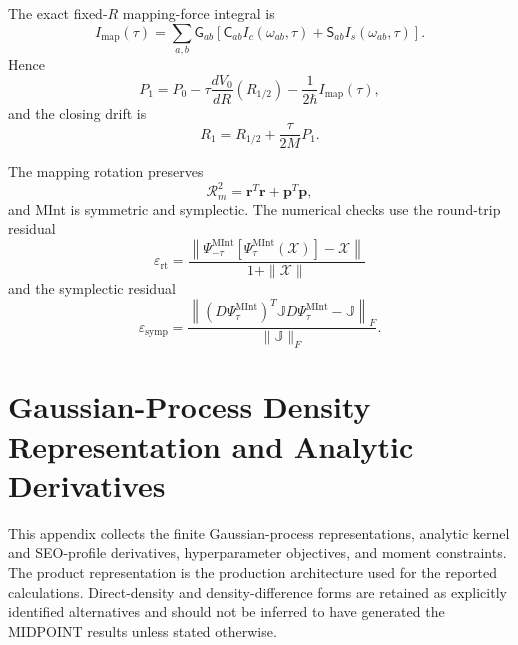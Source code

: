 \documentclass[
  11pt,
  letterpaper,
  onehalfspacing,
  normalmargins,
  equalmargins,
  oneside
]{ut-thesis}
\begin{document}
The exact fixed-\(R\) mapping-force integral is
\begin{equation}
I_{\mathrm{map}}(\tau)
=
\sum_{a,b}
\mathsf G_{ab}
\left[
\mathsf C_{ab}I_c(\omega_{ab},\tau)
+
\mathsf S_{ab}I_s(\omega_{ab},\tau)
\right].
\label{appeq:mint-exact-force-integral}
\end{equation}
Hence
\begin{equation}
P_1
=
P_0
-
\tau
\frac{dV_0}{dR}(R_{1/2})
-
\frac{1}{2\hbar}
I_{\mathrm{map}}(\tau),
\label{appeq:mint-momentum-update}
\end{equation}
and the closing drift is
\begin{equation}
R_1
=
R_{1/2}
+
\frac{\tau}{2M}P_1.
\label{appeq:mint-closing-drift}
\end{equation}

The mapping rotation preserves
\begin{equation}
\mathcal R_m^2
=
\mathbf r^T\mathbf r+\mathbf p^T\mathbf p,
\label{appeq:mint-radius-invariant}
\end{equation}
and MInt is symmetric and symplectic.  The numerical checks use the
round-trip residual
\begin{equation}
\varepsilon_{\mathrm{rt}}
=
\frac{
\left\|
\Psi_{-\tau}^{\mathrm{MInt}}
\left[
\Psi_\tau^{\mathrm{MInt}}
(\boldsymbol{\mathcal X})
\right]
-
\boldsymbol{\mathcal X}
\right\|
}{
1+\|\boldsymbol{\mathcal X}\|
}
\label{appeq:mint-roundtrip}
\end{equation}
and the symplectic residual
\begin{equation}
\varepsilon_{\mathrm{symp}}
=
\frac{
\left\|
\left(D\Psi_\tau^{\mathrm{MInt}}\right)^T
\mathbb J
D\Psi_\tau^{\mathrm{MInt}}
-
\mathbb J
\right\|_F
}{
\|\mathbb J\|_F
}.
\label{appeq:mint-symplectic-residual}
\end{equation}

\chapter[GP Density and Derivatives]{Gaussian-Process Density Representation and Analytic Derivatives}
\label{app:gp-density-derivatives}

This appendix collects the finite Gaussian-process representations, analytic
kernel and SEO-profile derivatives, hyperparameter objectives, and moment
constraints. The product representation is the production architecture used
for the reported calculations. Direct-density and density-difference forms are
retained as explicitly identified alternatives and should not be inferred to
have generated the MIDPOINT results unless stated otherwise.
\end{document}

